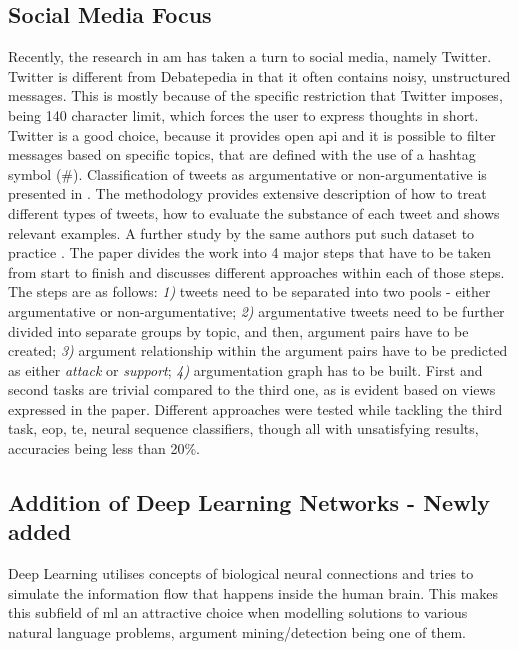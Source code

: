         
    \subsection{Social Media Focus}
        Recently, the research in \gls{am} has taken a turn to social media, namely Twitter. Twitter is different from Debatepedia in that it often contains noisy, unstructured messages. This is mostly because of the specific restriction that Twitter imposes, being 140 character limit, which forces the user to express thoughts in short. Twitter is a good choice, because it provides open \gls{api} and it is possible to filter messages based on specific topics, that are defined with the use of a hashtag symbol (\#). Classification of tweets as argumentative or non-argumentative is presented in \autocite{Bosc2016DARTAD}. The methodology provides extensive description of how to treat different types of tweets, how to evaluate the substance of each tweet and shows relevant examples. A further study by the same authors put such dataset to practice \autocite{Bosc2016TweetiesSP}. The paper divides the work into 4 major steps that have to be taken from start to finish and discusses different approaches within each of those steps. The steps are as follows: \textit{1)} tweets need to be separated into two pools - either argumentative or non-argumentative; \textit{2)} argumentative tweets need to be further divided into separate groups by topic, and then, argument pairs have to be created; \textit{3)} argument relationship within the argument pairs have to be predicted as either \textit{attack} or \textit{support}; \textit{4)} argumentation graph has to be built. First and second tasks are trivial compared to the third one, as is evident based on views expressed in the paper. Different approaches were tested while tackling the third task, \gls{eop}, \gls{te}, neural sequence classifiers, though all with unsatisfying results, accuracies being less than 20\%.
    
    \subsection{Addition of Deep Learning Networks - Newly added}
        Deep Learning utilises concepts of biological neural connections and tries to simulate the information flow that happens inside the human brain. This makes this subfield of \gls{ml} an attractive choice when modelling solutions to various natural language problems, argument mining/detection being one of them.
            
